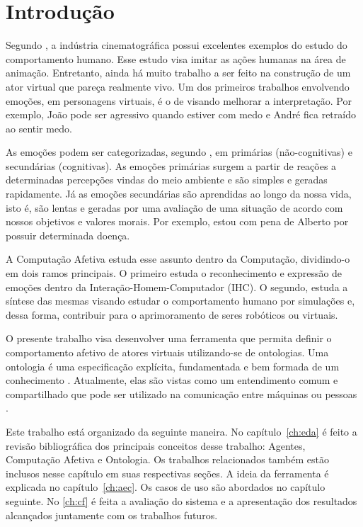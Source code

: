 \chapter{Introdução}

Segundo \citet{terzopoulos1998behavioral}, a indústria cinematográfica possui
excelentes exemplos do estudo do comportamento humano. Esse estudo visa imitar
as ações humanas na área de animação. Entretanto, ainda há muito trabalho a
ser feito na construção de um ator virtual que pareça realmente vivo. Um dos
primeiros trabalhos envolvendo emoções, em personagens virtuais, é o de
\citet{bates1994role} visando melhorar a interpretação. Por exemplo, João pode
ser agressivo quando estiver com medo e André fica retraído ao sentir medo.

As emoções podem ser categorizadas, segundo \citet{damasio2004erro}, em
primárias (não-cognitivas) e secundárias (cognitivas). As emoções primárias
surgem a partir de reações a determinadas percepções vindas do meio ambiente e
são simples e geradas rapidamente. Já as emoções secundárias são aprendidas ao
longo da nossa vida, isto é, são lentas e geradas por uma avaliação de uma
situação de acordo com nossos objetivos e valores morais. Por exemplo, estou
com pena de Alberto por possuir determinada doença.

A Computação Afetiva estuda esse assunto dentro da Computação, dividindo-o em
dois ramos principais. O primeiro estuda o reconhecimento e expressão de
emoções dentro da Interação-Homem-Computador (IHC). O segundo, estuda a
síntese das mesmas visando estudar o comportamento humano por simulações e,
dessa forma, contribuir para o aprimoramento de seres robóticos ou virtuais.

O presente trabalho visa desenvolver uma ferramenta que permita definir o
comportamento afetivo de atores virtuais utilizando-se de ontologias. Uma
ontologia é uma especificação explícita, fundamentada e bem formada de um
conhecimento \cite{gruber1993translation}. Atualmente, elas são vistas como um
entendimento comum e compartilhado que pode ser utilizado na comunicação entre
máquinas ou pessoas \cite{wks2008towards}.

Este trabalho está organizado da seguinte maneira. No capítulo~\ref{ch:eda}
é feito a revisão bibliográfica dos principais conceitos desse trabalho:
Agentes, Computação Afetiva e Ontologia. Os trabalhos relacionados também
estão inclusos nesse capítulo em suas respectivas seções. A ideia da
ferramenta é explicada no capítulo~\ref{ch:aec}. Os casos de uso são abordados no
capítulo seguinte. No \ref{ch:cf} é feita a avaliação do sistema e a
apresentação dos resultados alcançados juntamente com os trabalhos futuros.
